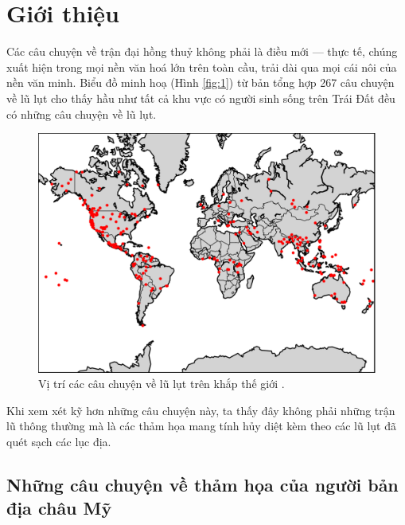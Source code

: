 \documentclass[10pt,twocolumn,letterpaper]{article}
\begin{document}
\section{Giới thiệu}

Các câu chuyện về trận đại hồng thuỷ không phải là điều mới — thực tế, chúng xuất hiện trong mọi nền văn hoá lớn trên toàn cầu, trải dài qua mọi cái nôi của nền văn minh. Biểu đồ minh hoạ (Hình \ref{fig:1}) từ bản tổng hợp 267 câu chuyện về lũ lụt \cite{3} cho thấy hầu như tất cả khu vực có người sinh sống trên Trái Đất đều có những câu chuyện về lũ lụt.

\begin{figure}[h]
\begin{center}
   \includegraphics[width=1\linewidth]{b.png}
\end{center}
   \caption{Vị trí các câu chuyện về lũ lụt trên khắp thế giới \cite{3}.}
\label{fig:1}
\label{fig:onecol}
\end{figure}

Khi xem xét kỹ hơn những câu chuyện này, ta thấy đây không phải những trận lũ thông thường mà là các thảm họa mang tính hủy diệt kèm theo các lũ lụt đã quét sạch các lục địa.

\subsection{Những câu chuyện về thảm họa của người bản địa châu Mỹ}
\end{document}
